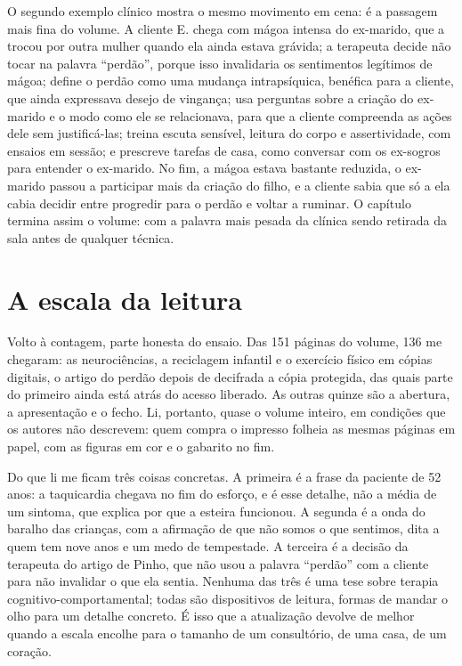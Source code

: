 \documentclass[12pt]{article}
\begin{document}
O segundo exemplo clínico mostra o mesmo movimento em cena: é a passagem mais fina do volume. A cliente E. chega com mágoa intensa do ex-marido, que a trocou por outra mulher quando ela ainda estava grávida; a terapeuta decide não tocar na palavra ``perdão'', porque isso invalidaria os sentimentos legítimos de mágoa; define o perdão como uma mudança intrapsíquica, benéfica para a cliente, que ainda expressava desejo de vingança; usa perguntas sobre a criação do ex-marido e o modo como ele se relacionava, para que a cliente compreenda as ações dele sem justificá-las; treina escuta sensível, leitura do corpo e assertividade, com ensaios em sessão; e prescreve tarefas de casa, como conversar com os ex-sogros para entender o ex-marido. No fim, a mágoa estava bastante reduzida, o ex-marido passou a participar mais da criação do filho, e a cliente sabia que só a ela cabia decidir entre progredir para o perdão e voltar a ruminar. O capítulo termina assim o volume: com a palavra mais pesada da clínica sendo retirada da sala antes de qualquer técnica.

\section{A escala da leitura}

Volto à contagem, parte honesta do ensaio. Das 151 páginas do volume, 136 me chegaram: as neurociências, a reciclagem infantil e o exercício físico em cópias digitais, o artigo do perdão depois de decifrada a cópia protegida, das quais parte do primeiro ainda está atrás do acesso liberado. As outras quinze são a abertura, a apresentação e o fecho. Li, portanto, quase o volume inteiro, em condições que os autores não descrevem: quem compra o impresso folheia as mesmas páginas em papel, com as figuras em cor e o gabarito no fim.

Do que li me ficam três coisas concretas. A primeira é a frase da paciente de 52 anos: a taquicardia chegava no fim do esforço, e é esse detalhe, não a média de um sintoma, que explica por que a esteira funcionou. A segunda é a onda do baralho das crianças, com a afirmação de que não somos o que sentimos, dita a quem tem nove anos e um medo de tempestade. A terceira é a decisão da terapeuta do artigo de Pinho, que não usou a palavra ``perdão'' com a cliente para não invalidar o que ela sentia. Nenhuma das três é uma tese sobre terapia cognitivo-comportamental; todas são dispositivos de leitura, formas de mandar o olho para um detalhe concreto. É isso que a atualização devolve de melhor quando a escala encolhe para o tamanho de um consultório, de uma casa, de um coração.
\end{document}
